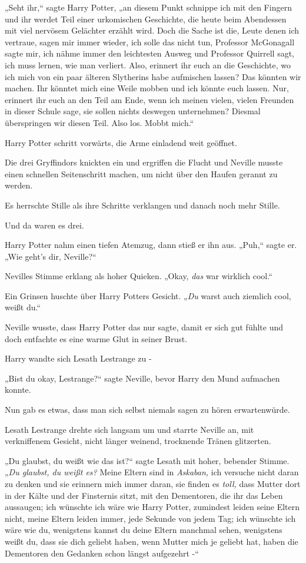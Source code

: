 {„Seht ihr,“ sagte Harry Potter, „an diesem Punkt schnippe ich mit den Fingern und ihr werdet Teil einer urkomischen Geschichte, die heute beim Abendessen mit viel nervösem Gelächter erzählt wird. Doch die Sache ist die, Leute denen ich vertraue, sagen mir immer wieder, ich solle das nicht tun, Professor McGonagall sagte mir, ich nähme immer den leichtesten Ausweg und Professor Quirrell sagt, ich muss lernen, wie man verliert. Also, erinnert ihr euch an die Geschichte, wo ich mich von ein paar älteren Slytherins habe aufmischen lassen? Das könnten wir machen. Ihr könntet mich eine Weile mobben und ich könnte euch lassen. Nur, erinnert ihr euch an den Teil am Ende, wenn ich meinen vielen, vielen Freunden in dieser Schule sage, sie sollen nichts deswegen unternehmen? Diesmal überspringen wir diesen Teil. Also los. Mobbt mich.“

Harry Potter schritt vorwärts, die Arme einladend weit geöffnet.

Die drei Gryffindors knickten ein und ergriffen die Flucht und Neville musste einen schnellen Seitenschritt machen, um nicht über den Haufen gerannt zu werden.

Es herrschte Stille als ihre Schritte verklangen und danach noch mehr Stille.

Und da waren es drei.

Harry Potter nahm einen tiefen Atemzug, dann stieß er ihn aus. „Puh,“ sagte er. „Wie geht's dir, Neville?“

Nevilles Stimme erklang als hoher Quieken. „Okay, \emph{das} war wirklich cool.“

Ein Grinsen huschte über Harry Potters Gesicht. „\emph{Du} warst auch ziemlich cool, weißt du.“

Neville wusste, dass Harry Potter das nur sagte, damit er sich gut fühlte und doch entfachte es eine warme Glut in seiner Brust.

Harry wandte sich Lesath Lestrange zu -

„Bist du okay, Lestrange?“ sagte Neville, bevor Harry den Mund aufmachen konnte.

Nun gab es etwas, dass man sich selbst niemals sagen zu hören erwartenwürde.

Lesath Lestrange drehte sich langsam um und starrte Neville an, mit verkniffenem Gesicht, nicht länger weinend, trocknende Tränen glitzerten.

„Du glaubst, du weißt wie das ist?“ sagte Lesath mit hoher, bebender Stimme. „\emph{Du glaubst, du weißt es?} Meine Eltern sind in \emph{Askaban,} ich versuche nicht daran zu denken und sie erinnern mich immer daran, sie finden es \emph{toll,} dass Mutter dort in der Kälte und der Finsternis sitzt, mit den Dementoren, die ihr das Leben aussaugen; ich wünschte ich wäre wie Harry Potter, zumindest leiden seine Eltern nicht, meine Eltern leiden immer, jede Sekunde von jedem Tag; ich wünschte ich wäre wie du, wenigstens kannst du deine Eltern manchmal sehen, wenigstens weißt du, dass sie dich geliebt haben, wenn Mutter mich je geliebt hat, haben die Dementoren den Gedanken schon längst aufgezehrt -“

}
